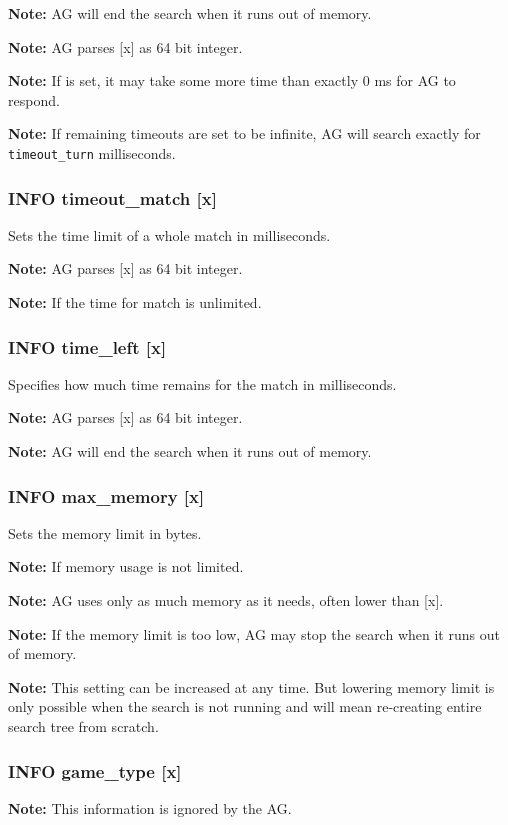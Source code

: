 \documentclass[12pt,a4paper]{article}
\begin{document}
\textbf{Note:} AG will end the search when it runs out of memory.

\textbf{Note:} AG parses [x] as 64 bit integer.

\textbf{Note:} If  is set, it may take some more time than exactly 0 ms for AG to respond.

\textbf{Note:} If remaining timeouts are set to be infinite, AG will search exactly for \texttt{timeout{\_}turn} milliseconds.

\subsubsection{INFO timeout{\_}match [x]}
\label{cmd_timeout_match}
Sets the time limit of a whole match in milliseconds.

\textbf{Note:} AG parses [x] as 64 bit integer.

\textbf{Note:} If  the time for match is unlimited.

\subsubsection{INFO time{\_}left [x]}
\label{cmd_info_time_left}
Specifies how much time remains for the match in milliseconds.

\textbf{Note:} AG parses [x] as 64 bit integer.

\textbf{Note:} AG will end the search when it runs out of memory.

\subsubsection{INFO max{\_}memory [x]}
\label{cmd_info_max_memory}
Sets the memory limit in bytes.

\textbf{Note:} If  memory usage is not limited.

\textbf{Note:} AG uses only as much memory as it needs, often lower than [x].

\textbf{Note:} If the memory limit is too low, AG may stop the search when it runs out of memory.

\textbf{Note:} This setting can be increased at any time. But lowering memory limit is only possible when the search is not running and will mean re-creating entire search tree from scratch.

\subsubsection{INFO game{\_}type [x]}
\label{cmd_info_game_type}
\textbf{Note:} This information is ignored by the AG.
\end{document}
